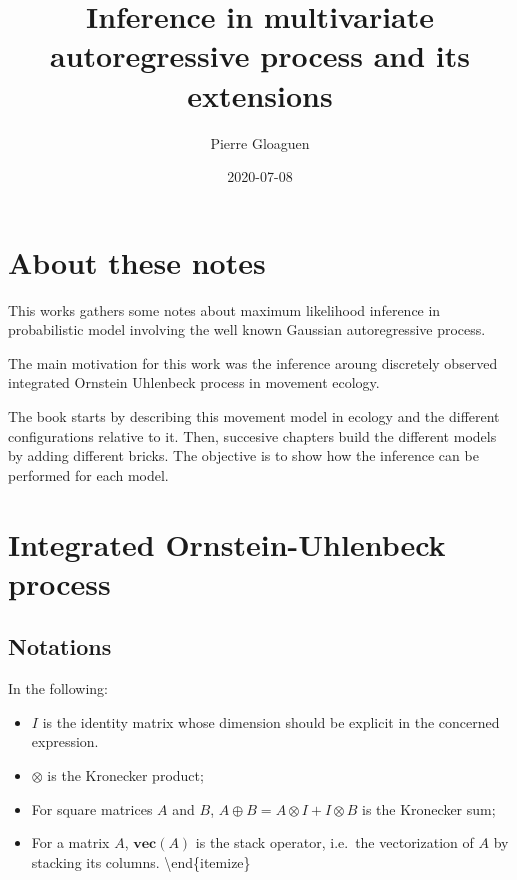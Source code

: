 \documentclass[]{book}
\title{Inference in multivariate autoregressive process and its extensions}
\author{Pierre Gloaguen}
\date{2020-07-08}
\providecommand{\tightlist}{%
  \setlength{\itemsep}{0pt}\setlength{\parskip}{0pt}}
\newcommand{\Vect}[1]{\textbf{vec}\left(#1 \right)}
\begin{document}
\maketitle

{
\setcounter{tocdepth}{1}
\tableofcontents
}
\hypertarget{about-these-notes}{%
\chapter*{About these notes}\label{about-these-notes}}

This works gathers some notes about maximum likelihood inference in probabilistic model involving the well known Gaussian autoregressive process.

The main motivation for this work was the inference aroung discretely observed integrated Ornstein Uhlenbeck process in movement ecology.

The book starts by describing this movement model in ecology and the different configurations relative to it. Then, succesive chapters build the different models by adding different bricks.
The objective is to show how the inference can be performed for each model.

\hypertarget{integrated-ornstein-uhlenbeck-process}{%
\chapter{Integrated Ornstein-Uhlenbeck process}\label{integrated-ornstein-uhlenbeck-process}}

\hypertarget{notations}{%
\section{Notations}\label{notations}}

In the following:

\begin{itemize}
\tightlist
\item
  \(I\) is the identity matrix whose dimension should be explicit in the concerned expression.
\item
  \(\otimes\) is the Kronecker product;
\item
  For square matrices \(A\) and \(B\), \(A \oplus B = A\otimes I + I \otimes B\) is the Kronecker sum;
\item
  For a matrix \(A\), \(\Vect A\) is the stack operator, i.e.~the vectorization of \(A\) by stacking its columns.
  \textbackslash{}end\{itemize\}
\end{itemize}
\end{document}
